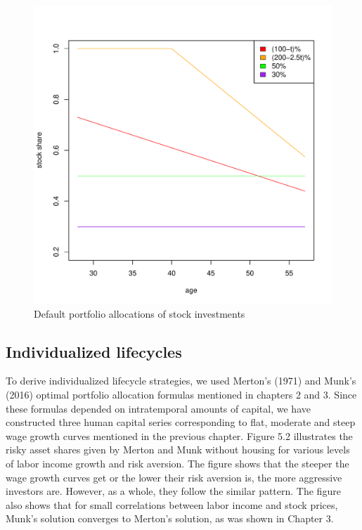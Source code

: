 \begin{figure}[h]
	\centering
	\includegraphics[scale=0.6]{figs/defaults.pdf}
	\caption{Default portfolio allocations of stock investments}
\end{figure}


\subsection{Individualized lifecycles}

To derive individualized lifecycle strategies, we used Merton's (1971) and Munk's (2016) optimal portfolio allocation formulas mentioned in chapters 2 and 3. Since these formulas depended on intratemporal amounts of capital, we have constructed three human capital series corresponding to flat, moderate and steep wage growth curves mentioned in the previous chapter. Figure 5.2 illustrates the risky asset shares given by Merton and Munk without housing for various levels of labor income growth and risk aversion. The figure shows that the steeper the wage growth curves get or the lower their risk aversion is, the more aggressive investors are. However, as a whole, they follow the similar pattern. The figure also shows that for small correlations between labor income and stock prices, Munk's solution converges to Merton's solution, as was shown in Chapter 3.

